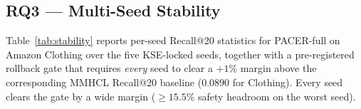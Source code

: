 \documentclass[conference]{IEEEtran}
\begin{document}
\begin{table}[!t]
\caption{RQ2 --- NRDMC-lite necessity on Amazon Clothing over the
five KSE-locked seeds ($100$-epoch shipping schedule). A0 is the
shipping PACER of Sec.~\ref{sec:nrdmc}; A1 is the same model with
NRDMC-lite disabled ($\lambda_{\text{cl}}{=}0$). Numbers are
$\text{mean}\pm\text{std}$ over the five seeds ($\times 100$).
Statistical rows are paired-$t$ contrasts with $\text{df}{=}4$; dir
is the number of seeds on which A0 beats A1.}
\label{tab:ablation}
\centering
\renewcommand{\arraystretch}{1.05}
\setlength{\tabcolsep}{3pt}
\end{table}

\subsection{RQ3 --- Multi-Seed Stability}
\label{sec:rq3}

Table~\ref{tab:stability} reports per-seed Recall@20 statistics for
PACER-full on Amazon Clothing over the five KSE-locked seeds, together
with a pre-registered rollback gate that requires \emph{every} seed
to clear a $+1\%$ margin above the corresponding MMHCL Recall@20
baseline ($0.0890$ for Clothing). Every seed clears the gate by a
wide margin ($\ge 15.5\%$ safety headroom on the worst seed).
\end{document}
